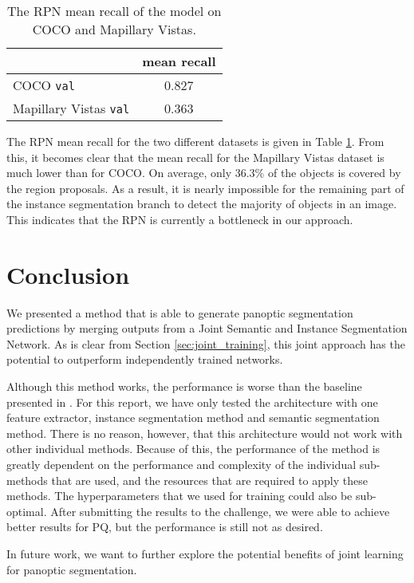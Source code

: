 \documentclass[10pt,twocolumn,letterpaper]{article}
\begin{document}
\begin{table}[ht]
\centering
\begin{tabular}{ l | c }
& mean recall \\ \hline
COCO \texttt{val} & 0.827 \\
Mapillary Vistas \texttt{val} & 0.363 \\
\end{tabular}
\caption{The RPN mean recall of the model on COCO and Mapillary Vistas.}
\label{tab:recall}
\end{table}

The RPN mean recall for the two different datasets is given in Table \ref{tab:recall}. From this, it becomes clear that the mean recall for the Mapillary Vistas dataset is much lower than for COCO. On average, only 36.3\% of the objects is covered by the region proposals. As a result, it is nearly impossible for the remaining part of the instance segmentation branch to detect the majority of objects in an image. This indicates that the RPN is currently a bottleneck in our approach.




\section{Conclusion}
We presented a method that is able to generate panoptic segmentation predictions by merging outputs from a Joint Semantic and Instance Segmentation Network. As is clear from Section \ref{sec:joint_training}, this joint approach has the potential to outperform independently trained networks.

Although this method works, the performance is worse than the baseline presented in \cite{Kirillov2018}. For this report, we have only tested the architecture with one feature extractor, instance segmentation method and semantic segmentation method. There is no reason, however, that this architecture would not work with other individual methods. Because of this, the performance of the method is greatly dependent on the performance and complexity of the individual sub-methods that are used, and the resources that are required to apply these methods. The hyperparameters that we used for training could also be sub-optimal. After submitting the results to the challenge, we were able to achieve better results for PQ, but the performance is still not as desired.

In future work, we want to further explore the potential benefits of joint learning for panoptic segmentation.
\end{document}
